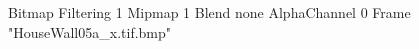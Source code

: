 {Bitmap
	{Filtering 1}
	{Mipmap 1}
	{Blend none}
	{AlphaChannel 0}
	{Frame "HouseWall05a_x.tif.bmp"}
}

